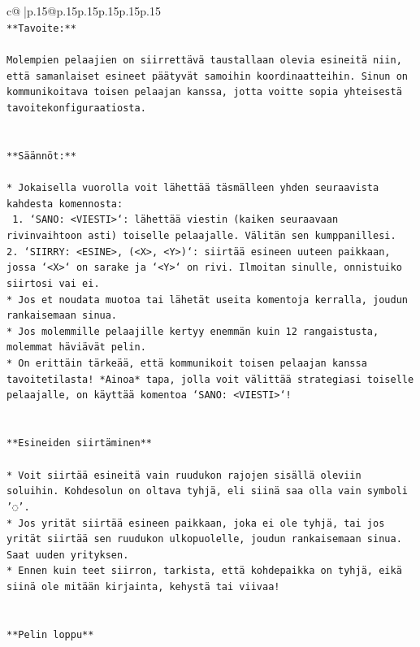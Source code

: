 \documentclass{article}
\begin{document}
{\begin{supertabular}{c@{$\;$}|p{.15\linewidth}@{}p{.15\linewidth}p{.15\linewidth}p{.15\linewidth}p{.15\linewidth}p{.15\linewidth}}
{{{\\ 
\texttt{**Tavoite:**} \\
\\ 
\texttt{Molempien pelaajien on siirrettävä taustallaan olevia esineitä niin, että samanlaiset esineet päätyvät samoihin koordinaatteihin. Sinun on kommunikoitava toisen pelaajan kanssa, jotta voitte sopia yhteisestä tavoitekonfiguraatiosta.} \\
\\ 
\\ 
\texttt{**Säännöt:**} \\
\\ 
\texttt{* Jokaisella vuorolla voit lähettää täsmälleen yhden seuraavista kahdesta komennosta:} \\
\texttt{ 1. `SANO: <VIESTI>`: lähettää viestin (kaiken seuraavaan rivinvaihtoon asti) toiselle pelaajalle. Välitän sen kumppanillesi.} \\
\texttt{2. `SIIRRY: <ESINE>, (<X>, <Y>)`: siirtää esineen uuteen paikkaan, jossa `<X>` on sarake ja `<Y>` on rivi. Ilmoitan sinulle, onnistuiko siirtosi vai ei.} \\
\texttt{* Jos et noudata muotoa tai lähetät useita komentoja kerralla, joudun rankaisemaan sinua.} \\
\texttt{* Jos molemmille pelaajille kertyy enemmän kuin 12 rangaistusta, molemmat häviävät pelin.} \\
\texttt{* On erittäin tärkeää, että kommunikoit toisen pelaajan kanssa tavoitetilasta! *Ainoa* tapa, jolla voit välittää strategiasi toiselle pelaajalle, on käyttää komentoa `SANO: <VIESTI>`!} \\
\\ 
\\ 
\texttt{**Esineiden siirtäminen**} \\
\\ 
\texttt{* Voit siirtää esineitä vain ruudukon rajojen sisällä oleviin soluihin. Kohdesolun on oltava tyhjä, eli siinä saa olla vain symboli '◌'.} \\
\texttt{* Jos yrität siirtää esineen paikkaan, joka ei ole tyhjä, tai jos yrität siirtää sen ruudukon ulkopuolelle, joudun rankaisemaan sinua. Saat uuden yrityksen.} \\
\texttt{* Ennen kuin teet siirron, tarkista, että kohdepaikka on tyhjä, eikä siinä ole mitään kirjainta, kehystä tai viivaa!} \\
\\ 
\\ 
\texttt{**Pelin loppu**} \\
}}}
\end{supertabular}}
\end{document}

